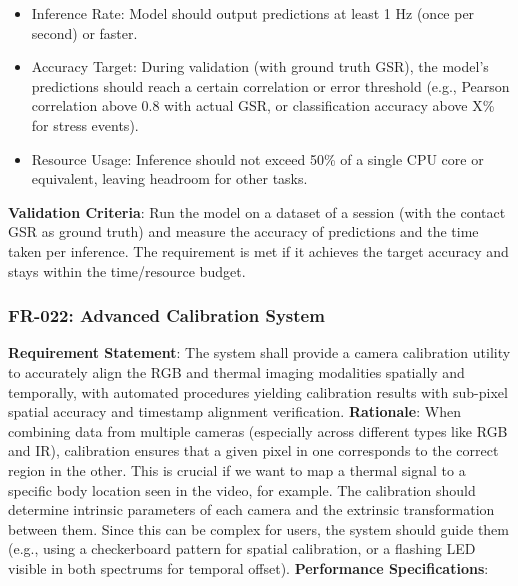 \documentclass[11pt,a4paper]{report}
\begin{document}
\begin{itemize}
\item Inference Rate: Model should output predictions at least 1 Hz (once per second) or faster.
\item Accuracy Target: During validation (with ground truth GSR), the model’s predictions should reach a certain correlation or error threshold (e.g., Pearson correlation above 0.8 with actual GSR, or classification accuracy above X\% for stress events).
\item Resource Usage: Inference should not exceed 50\% of a single CPU core or equivalent, leaving headroom for other tasks.
\end{itemize} \textbf{Validation Criteria}: Run the model on a dataset of a session (with the contact GSR as ground truth) and measure the accuracy of predictions and the time taken per inference. The requirement is met if it achieves the target accuracy and stays within the time/resource budget. \subsubsection*{FR-022: Advanced Calibration System}
\textbf{Requirement Statement}: The system shall provide a camera calibration utility to accurately align the RGB and thermal imaging modalities spatially and temporally, with automated procedures yielding calibration results with sub-pixel spatial accuracy and timestamp alignment verification. \textbf{Rationale}: When combining data from multiple cameras (especially across different types like RGB and IR), calibration ensures that a given pixel in one corresponds to the correct region in the other. This is crucial if we want to map a thermal signal to a specific body location seen in the video, for example. The calibration should determine intrinsic parameters of each camera and the extrinsic transformation between them. Since this can be complex for users, the system should guide them (e.g., using a checkerboard pattern for spatial calibration, or a flashing LED visible in both spectrums for temporal offset). \textbf{Performance Specifications}:
\end{document}
